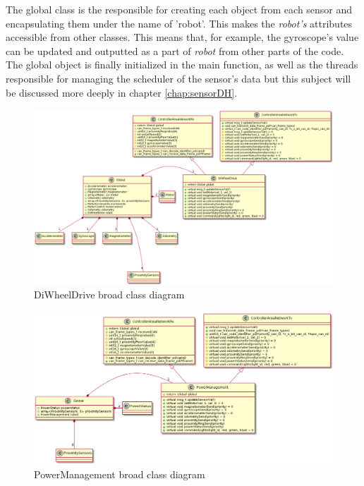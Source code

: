 \documentclass[12pt]{report}%
\begin{document}
The global class is the responsible for creating each object from each sensor and encapsulating them under the name of 'robot'. This makes the \textit{robot's} attributes accessible from other classes. This means that, for example, the gyroscope's value can be updated and outputted as a part of \textit{robot} from other parts of the code. The global object is finally initialized in the main function, as well as the threads responsible for managing the scheduler of the sensor's data but this subject will be discussed more deeply in chapter \ref{chap:sensorDH}.

\begin{figure}[ht]
	\centering
	\includegraphics[width=\textwidth]{DWDclass}
    \caption{DiWheelDrive broad class diagram}
    \label{fig:DWDclass}
\end{figure}

\begin{figure}[ht]
	\centering
	\includegraphics[width=\textwidth]{PMclass}
    \caption{PowerManagement broad class diagram}
    \label{fig:PMclass}
\end{figure}
\end{document}
